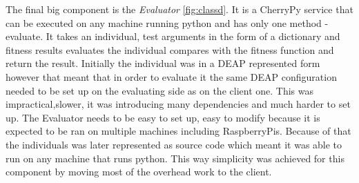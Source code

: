 The final big component is the \textit{Evaluator} \ref{fig:classd}. It is a CherryPy service that can be executed on any machine running python and
 has only one method - evaluate. It takes an individual, test arguments in the form of a dictionary and  fitness
results evaluates the individual compares with the fitness function and return the result. Initially the individual was in a DEAP
represented form however that meant that in order to evaluate it the same DEAP configuration needed to be set up on the evaluating side as on the client one.
This was impractical,slower, it was introducing many dependencies and much harder to set up. The Evaluator needs
to be easy to set up, easy to modify because it is expected to be ran on multiple machines including RaspberryPis.
Because of that the individuals was later represented as source code which meant it was able to run on any machine
that runs python. This way simplicity was achieved for this component by moving most of the overhead work to the client.
